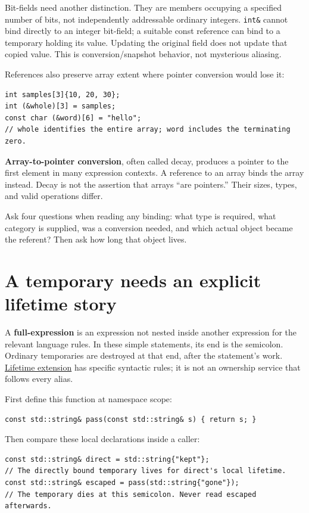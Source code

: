 Bit-fields need another distinction. They are members occupying a specified number of bits, not independently addressable ordinary integers. \texttt{int\&} cannot bind directly to an integer bit-field; a suitable const reference can bind to a temporary holding its value. Updating the original field does not update that copied value. This is conversion/snapshot behavior, not mysterious aliasing.

References also preserve array extent where pointer conversion would lose it:

\begin{verbatim}
int samples[3]{10, 20, 30};
int (&whole)[3] = samples;
const char (&word)[6] = "hello";
// whole identifies the entire array; word includes the terminating zero.
\end{verbatim}

\textbf{Array-to-pointer conversion}, often called decay, produces a pointer to the first element in many expression contexts. A reference to an array binds the array instead. Decay is not the assertion that arrays ``are pointers.'' Their sizes, types, and valid operations differ.

Ask four questions when reading any binding: what type is required, what category is supplied, was a conversion needed, and which actual object became the referent? Then ask how long that object lives.

\section{A temporary needs an explicit lifetime story}\label{01-foundations-i-ch003-a-temporary-needs-an-explicit-lifetime-story}

A \textbf{full-expression} is an expression not nested inside another expression for the relevant language rules. In these simple statements, its end is the semicolon. Ordinary temporaries are destroyed at that end, after the statement's work. \hyperref[appendix-a978b29bbbb0]{Lifetime extension} has specific syntactic rules; it is not an ownership service that follows every alias.

First define this function at namespace scope:

\begin{verbatim}
const std::string& pass(const std::string& s) { return s; }
\end{verbatim}

Then compare these local declarations inside a caller:

\begin{verbatim}
const std::string& direct = std::string{"kept"};
// The directly bound temporary lives for direct's local lifetime.
const std::string& escaped = pass(std::string{"gone"});
// The temporary dies at this semicolon. Never read escaped afterwards.
\end{verbatim}


